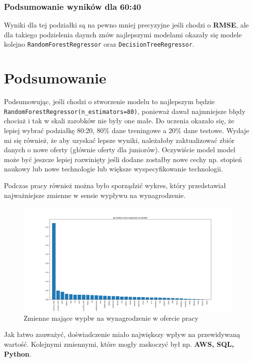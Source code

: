 \documentclass[a4paper]{article}
\begin{document}
\subsubsection{Podsumowanie wyników dla 60:40}


\quad Wyniki dla tej podziałki są na pewno mniej precyzyjne jeśli chodzi o \textbf{RMSE}, ale dla takiego podzielenia daynch znów najlepszymi modelami okazały się modele
kolejno \texttt{RandomForestRegressor} oraz \texttt{DecisionTreeRegressor}.

\section{Podsumowanie}
\quad Podsumowując, jeśli chodzi o stworzenie modelu to najlepszym będzie \newline \texttt{RandomForestRegressor(n\_estimators=80)},
ponieważ dawał najmniejsze błędy chociaż i tak w skali zarobków nie były one małe.
Do uczenia okazało się, że lepiej wybrać podziałkę 80:20, 80\% dane treningowe a 20\% dane testowe. Wydaje mi się również, że aby uzyskać lepsze wyniki,
należałoby zaktualizować zbiór danych o nowe oferty (głównie oferty dla juniorów).
Oczywiście model model może być jeszcze lepiej rozwinięty jeśli dodane zostałby nowe cechy np. stopień naukowy lub nowe 
technologie lub większe wyspecyfikowanie technologii.

\quad Podczas pracy również można było sporządzić wykres, który przedstawiał najważniejsze zmienne w sensie wypływu na wynagrodzenie.

\begin{figure}[H]
    \centering
    \includegraphics[width=\textwidth]{../analysis/plots/wyniki/importance_of_vars.png}
    \caption{Zmienne mające wypłw na wynagrodzenie w ofercie pracy}
\end{figure}

\quad Jak łatwo zauważyć, doświadczenie miało największy wpływ na przewidywaną wartość.
Kolejnymi zmiennymi, które mogły zaskoczyć był np. \textbf{AWS, SQL, Python}. 
\end{document}
